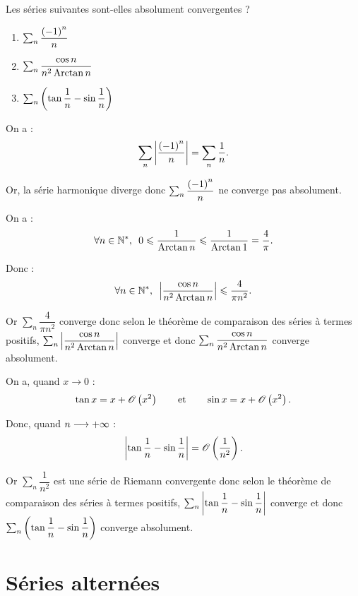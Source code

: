 \begin{exoex}
Les séries suivantes sont-elles absolument convergentes ?

\begin{enumerate}
    \item \(\sum_n\dfrac{\left(-1\right)^n}{n}\) \\
    \item \(\sum_n\dfrac{\cos n}{n^2\operatorname{Arctan} n}\) \\
    \item \(\sum_n\left(\tan\dfrac{1}{n}-\sin\dfrac{1}{n}\right)\)
\end{enumerate}
\end{exoex}

\begin{corr}[1]
On a : \[\sum_n\left\lvert\dfrac{\left(-1\right)^n}{n}\right\rvert=\sum_n\dfrac{1}{n}.\]

Or, la série harmonique diverge donc \(\sum_n\dfrac{\left(-1\right)^n}{n}\) ne converge pas absolument.
\end{corr}

\begin{corr}[2]
On a : \[\quantifs{\forall n\in\Ns}0\leq\dfrac{1}{\Arctan n}\leq\dfrac{1}{\Arctan1}=\dfrac{4}{\pi}.\]

Donc : \[\quantifs{\forall n\in\Ns}\abs{\dfrac{\cos n}{n^2\Arctan n}}\leq\dfrac{4}{\pi n^2}.\]

Or \(\sum_n\dfrac{4}{\pi n^2}\) converge donc selon le théorème de comparaison des séries à termes positifs, \(\sum_n\left\lvert\dfrac{\cos n}{n^2\operatorname{Arctan} n}\right\rvert\) converge et donc \(\sum_n\dfrac{\cos n}{n^2\operatorname{Arctan} n}\) converge absolument.
\end{corr}

\begin{corr}[3]
On a, quand \(x\to0\) : \[\tan x=x+\mathscr{O}\left(x^2\right)\qquad\text{et}\qquad\sin x=x+\mathscr{O}\left(x^2\right).\]

Donc, quand \(n\longrightarrow+\infty\) : \[\left\lvert\tan\dfrac{1}{n}-\sin\dfrac{1}{n}\right\rvert=\mathscr{O}\left(\dfrac{1}{n^2}\right).\]

Or \(\sum_n\dfrac{1}{n^2}\) est une série de Riemann convergente donc selon le théorème de comparaison des séries à termes positifs, \(\sum_n\left\lvert\tan\dfrac{1}{n}-\sin\dfrac{1}{n}\right\rvert\) converge et donc \(\sum_n\left(\tan\dfrac{1}{n}-\sin\dfrac{1}{n}\right)\) converge absolument.
\end{corr}

\section{Séries alternées}


